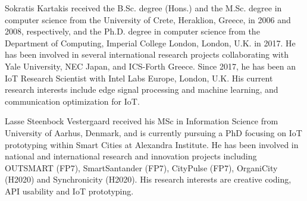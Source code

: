 \documentclass[journal]{IEEEtran}
\begin{document}
\vspace{-7ex}
\begin{IEEEbiography}
{Sokratis Kartakis} received the B.Sc. degree (Hons.) and the M.Sc. degree in computer science from the University of Crete, Heraklion, Greece, in 2006 and 2008, respectively, and the Ph.D. degree in computer science from the Department of Computing, Imperial College London, London, U.K. in 2017. He has been involved in several international research projects collaborating with Yale University, NEC Japan, and ICS-Forth Greece. Since 2017, he has been an IoT Research Scientist with Intel Labs Europe, London, U.K. His current research interests include edge signal processing and machine learning, and communication optimization for IoT.

\end{IEEEbiography}
\vspace{-7ex}
\begin{IEEEbiography}{Lasse Steenbock Vestergaard}
received his MSc in Information Science from University of Aarhus, Denmark, and is currently pursuing a PhD focusing on IoT prototyping within Smart Cities at Alexandra Institute. He has been involved in national and international research and innovation projects including OUTSMART (FP7), SmartSantander (FP7), CityPulse (FP7), OrganiCity (H2020) and Synchronicity (H2020). His research interests are creative coding, API usability and IoT prototyping.
\end{IEEEbiography}
\end{document}
